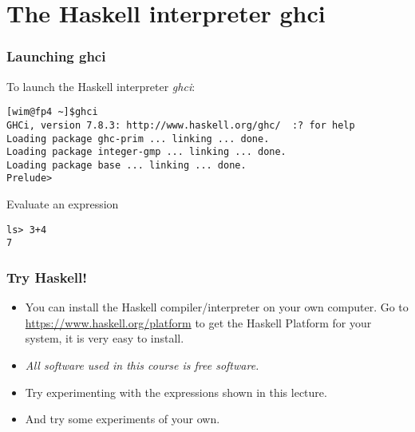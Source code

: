 \documentclass{beamer}
\begin{document}
\section{The Haskell interpreter ghci}



\begin{frame}[fragile]
\frametitle{Launching ghci}

To launch the  Haskell interpreter \emph{ghci}:
{\footnotesize
\begin{verbatim}
[wim@fp4 ~]$ghci
GHCi, version 7.8.3: http://www.haskell.org/ghc/  :? for help
Loading package ghc-prim ... linking ... done.
Loading package integer-gmp ... linking ... done.
Loading package base ... linking ... done.
Prelude> 
\end{verbatim}
}

Evaluate an expression

\begin{verbatim}
ls> 3+4
7
\end{verbatim}

\end{frame}

\begin{frame}
\frametitle{Try Haskell!}

\begin{itemize}
\item You can install the Haskell compiler/interpreter on your own computer. Go to \url{https://www.haskell.org/platform} to get the Haskell Platform for your system, it is very easy to install.

\item \emph{All software used in this course is free software.}
\item Try experimenting with the expressions shown in this lecture.
\item And try some experiments of your own.
\end{itemize}

\end{frame}
\end{document}
